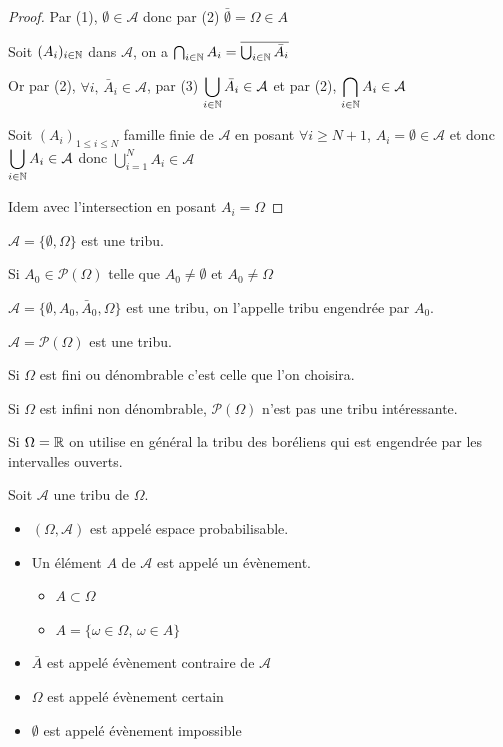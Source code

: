 \begin{proof}
    Par (1), $\emptyset \in \mathcal A$ donc par (2) $\bar \emptyset = \Omega \in A$

    \avspace Soit $(A_i)_{i \in \mathbb{N}}$ dans $\displaystyle \mathcal A$, on a $\bigcap_{i \in \mathbb{N}} A_i = \overline{\bigcup_{i \in \mathbb{N}} \bar A_i}$

    Or par (2), $\forall i, \, \bar A_i \in \mathcal A$, par (3) $\displaystyle \bigcup_{i \in \mathbb{N}} \bar A_i \in \mathcal A$
    et par (2), $\displaystyle \bigcap_{i \in \mathbb{N}} A_i \in \mathcal A$

    \avspace Soit $\displaystyle (A_i)_{1 \leqslant i \leqslant N}$ famille finie de $\mathcal A$ en posant 
    $\forall i \geqslant N+ 1 $, $A_i = \emptyset \in \mathcal A$ et donc $\displaystyle \bigcup_{i \in \mathbb{N}} A_i \in \mathcal A$
    donc $\displaystyle \bigcup_{i = 1}^N A_i \in \mathcal A$

    \avspace Idem avec l'intersection en posant $A_i = \Omega$
\end{proof}


\begin{exemple}
    $\mathcal A = \{\emptyset, \Omega\}$ est une tribu. 

    \avspace Si $A_0 \in \mathscr P(\Omega)$ telle que $A_0 \neq \emptyset$ et $A_0 \neq \Omega$

    \avspace $\mathcal A = \{\emptyset, A_0, \bar A_0, \Omega\}$ est une tribu, on l'appelle tribu 
    engendrée par $A_0$. 

    \avspace $\mathcal A = \mathscr P(\Omega)$ est une tribu. 

    Si $\Omega$ est fini ou dénombrable c'est celle que l'on choisira. 

    Si $\Omega$ est infini non dénombrable, $\mathscr P(\Omega)$ n'est pas une tribu intéressante. 

    Si $\Omega = \mathbb{R}$ on utilise en général la tribu des boréliens qui est engendrée par les intervalles ouverts. 
\end{exemple}

\begin{definition}{}{}
    Soit $\mathcal A$ une tribu de $\Omega$. 
    \begin{itemize}
        \item $(\Omega, \mathcal A)$ est appelé espace probabilisable. 
        \item Un élément $A$ de $\mathcal A$ est appelé un évènement. 
        \begin{itemize}
            \item $A \subset \Omega$
            \item $A = \{ \omega \in \Omega, \, \omega \in A\}$
        \end{itemize}
        \item $\bar A$ est appelé évènement contraire de $\mathcal A$
        \item $\Omega$ est appelé évènement certain
        \item $\emptyset$ est appelé évènement impossible
    \end{itemize}
\end{definition}

